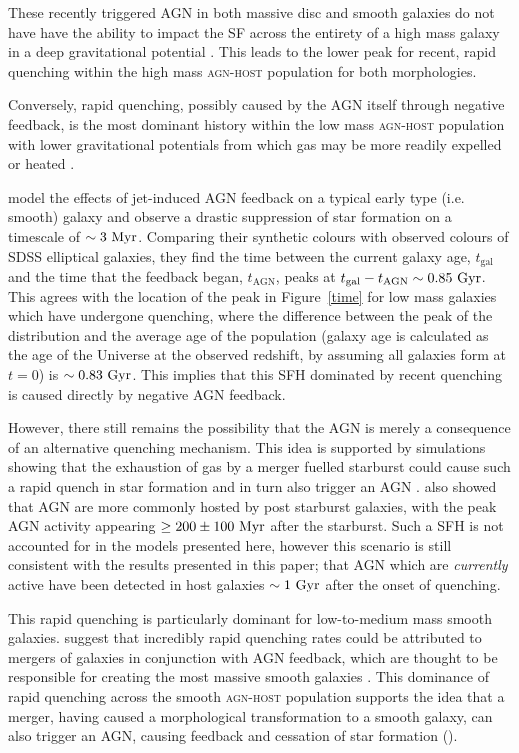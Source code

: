 These recently triggered AGN in both massive disc and smooth galaxies do not have have the ability to impact the SF across the entirety of a high mass galaxy in a deep gravitational potential \citep{ishibashi12, Zinn13}. This leads to the lower peak for recent, rapid quenching within the high mass \textsc{agn-host} population for both morphologies. 

Conversely, rapid quenching, possibly caused by the AGN itself through negative feedback, is the most dominant history within the low mass \textsc{agn-host} population with lower gravitational potentials from which gas may be more readily expelled or heated \citep{tortora09}. 

\cite{tortora09} model the effects of jet-induced AGN feedback on a typical early type (i.e. smooth) galaxy and observe a drastic suppression of star formation on a timescale of $\sim 3 ~\rm{Myr}$. Comparing their synthetic colours with observed colours of SDSS elliptical galaxies, they find the time between the current galaxy age, $t_\mathrm{gal}$ and the time that the feedback began, $t_\mathrm{AGN}$, peaks at $t_\mathrm{gal} - t_\mathrm{AGN} \sim 0.85 ~\rm{Gyr}$. This agrees with the location of the peak in Figure~\ref{time} for low mass galaxies  which have undergone quenching, where the difference between the peak of the distribution and the average age of the population (galaxy age is calculated as the age of the Universe at the observed redshift, by assuming all galaxies form at $t=0$) is $\sim0.83 ~\rm{Gyr}$. This implies that this SFH dominated by recent quenching is caused directly by negative AGN feedback.


However, there still remains the possibility that the AGN is merely a consequence of an alternative quenching mechanism. This idea is supported by simulations showing that the exhaustion of gas by a merger fuelled starburst could cause such a rapid quench in star formation and in turn also trigger an AGN \citep{Croton06, Wild09, Snyder11, Hayward14}. \citet{Yesuf14} also showed that AGN are more commonly hosted by post starburst galaxies, with the peak AGN activity appearing $\geq 200 \pm 100 ~\rm{Myr}$ after the starburst. Such a SFH is not accounted for in the models presented here, however this scenario is still consistent with the results presented in this paper; that AGN which are \emph{currently} active have been detected in host galaxies $\sim 1~\rm{Gyr}$ after the onset of quenching.

This rapid quenching is particularly dominant for low-to-medium mass smooth galaxies. \cite{smethurst15} suggest that incredibly rapid quenching rates could be attributed to mergers of galaxies in conjunction with AGN feedback, which are thought to be responsible for creating the most massive smooth galaxies \citep{conselice03b, springel05b, hopkins08b}. This dominance of rapid quenching across the smooth \textsc{agn-host} population supports the idea that a merger, having caused a morphological transformation to a smooth galaxy, can also trigger an AGN, causing feedback and cessation of star formation (\citealt{Sanders88}).

